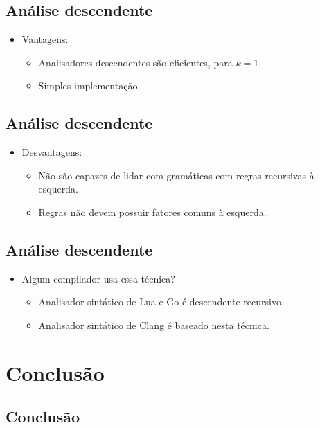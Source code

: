 \documentclass[11pt]{article}
\begin{document}
\subsection*{Análise descendente}
\label{sec:org8c60347}

\begin{itemize}
\item Vantagens:
\begin{itemize}
\item Analisadores descendentes são eficientes, para \(k = 1\).
\item Simples implementação.
\end{itemize}
\end{itemize}
\subsection*{Análise descendente}
\label{sec:orge388de2}

\begin{itemize}
\item Desvantagens:
\begin{itemize}
\item Não são capazes de lidar com gramáticas com regras recursivas à esquerda.
\item Regras não devem possuir fatores comuns à esquerda.
\end{itemize}
\end{itemize}
\subsection*{Análise descendente}
\label{sec:org22484bb}

\begin{itemize}
\item Algum compilador usa essa técnica?
\begin{itemize}
\item Analisador sintático de Lua e Go é descendente recursivo.
\item Analisador sintático de Clang é baseado nesta técnica.
\end{itemize}
\end{itemize}
\section*{Conclusão}
\label{sec:orgc3a6306}

\subsection*{Conclusão}
\label{sec:org0692806}
\end{document}
